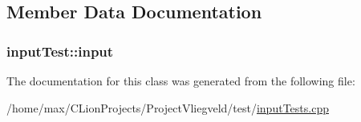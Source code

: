 \subsection{Member Data Documentation}
\subsubsection[{\texorpdfstring{input}{input}}]{ input\+Test\+::input\hspace{0.3cm}{\ttfamily [protected]}}\hypertarget{classinputTest_a882f2a4014812a95a6d58db894f288b1}{}\label{classinputTest_a882f2a4014812a95a6d58db894f288b1}


The documentation for this class was generated from the following file\+:\begin{DoxyCompactItemize}
\item 
/home/max/\+C\+Lion\+Projects/\+Project\+Vliegveld/test/\hyperlink{inputTests_8cpp}{input\+Tests.\+cpp}\end{DoxyCompactItemize}
